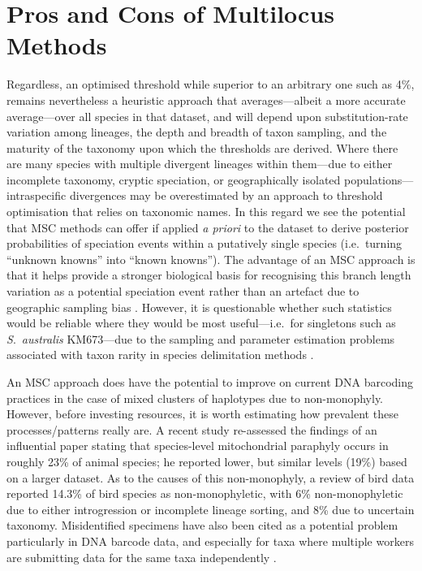 \documentclass[12pt]{article}
\begin{document}
\section*{Pros and Cons of Multilocus Methods}

Regardless, an optimised threshold while superior to an arbitrary one such as 4\%, remains nevertheless a heuristic approach that averages---albeit a more accurate average---over all species in that dataset, and will depend upon substitution-rate variation among lineages, the depth and breadth of taxon sampling, and the maturity of the taxonomy upon which the thresholds are derived. Where there are many species with multiple divergent lineages within them---due to either incomplete taxonomy, cryptic speciation, or geographically isolated populations---intraspecific divergences may be overestimated by an approach to threshold optimisation that relies on taxonomic names. In this regard we see the potential that MSC methods can offer if applied \emph{a priori} to the dataset to derive posterior probabilities of speciation events within a putatively single species (i.e.\ turning ``unknown knowns'' into ``known knowns''). The advantage of an MSC approach is that it helps provide a stronger biological basis for recognising this branch length variation as a potential speciation event rather than an artefact due to geographic sampling bias \citep{Bergsten2012}. However, it is questionable whether such statistics would be reliable where they would be most useful---i.e.\ for singletons such as \emph{S}.\ \emph{australis} KM673---due to the sampling and parameter estimation problems associated with taxon rarity in species delimitation  methods \citep{Lim2012}.

An MSC approach does have the potential to improve on current DNA barcoding practices in the case of mixed clusters of haplotypes due to non-monophyly. However, before investing resources, it is worth estimating how prevalent these processes/patterns really are. A recent study \citep{Ross2014} re-assessed the findings of an influential paper \citep{Funk2003} stating that species-level mitochondrial paraphyly occurs in roughly 23\% of animal species; he reported lower, but similar levels (19\%) based on a larger dataset. As to the causes of this non-monophyly, a review of bird data \citep{McKay2010} reported 14.3\% of bird species as non-monophyletic, with 6\% non-monophyletic due to either introgression or incomplete lineage sorting, and 8\% due to uncertain taxonomy. Misidentified specimens have also been cited as a potential problem particularly in DNA barcode data, and especially for taxa where multiple workers are submitting data for the same taxa independently \citep{Collins2013}. 
\end{document}
